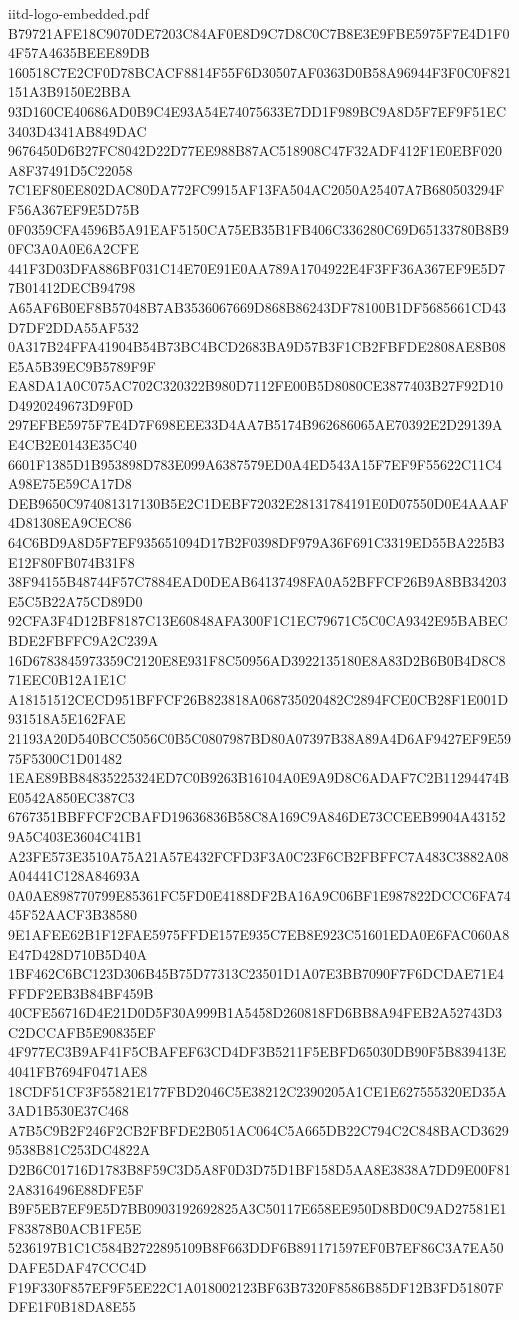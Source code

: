 \begin{filecontents*}[overwrite]{iitd-logo-embedded.pdf}
B79721AFE18C9070DE7203C84AF0E8D9C7D8C0C7B8E3E9FBE5975F7E4D1F04F57A4635BEEE89DB
160518C7E2CF0D78BCACF8814F55F6D30507AF0363D0B58A96944F3F0C0F821151A3B9150E2BBA
93D160CE40686AD0B9C4E93A54E74075633E7DD1F989BC9A8D5F7EF9F51EC3403D4341AB849DAC
9676450D6B27FC8042D22D77EE988B87AC518908C47F32ADF412F1E0EBF020A8F37491D5C22058
7C1EF80EE802DAC80DA772FC9915AF13FA504AC2050A25407A7B680503294FF56A367EF9E5D75B
0F0359CFA4596B5A91EAF5150CA75EB35B1FB406C336280C69D65133780B8B90FC3A0A0E6A2CFE
441F3D03DFA886BF031C14E70E91E0AA789A1704922E4F3FF36A367EF9E5D77B01412DECB94798
A65AF6B0EF8B57048B7AB3536067669D868B86243DF78100B1DF5685661CD43D7DF2DDA55AF532
0A317B24FFA41904B54B73BC4BCD2683BA9D57B3F1CB2FBFDE2808AE8B08E5A5B39EC9B5789F9F
EA8DA1A0C075AC702C320322B980D7112FE00B5D8080CE3877403B27F92D10D4920249673D9F0D
297EFBE5975F7E4D7F698EEE33D4AA7B5174B962686065AE70392E2D29139AE4CB2E0143E35C40
6601F1385D1B953898D783E099A6387579ED0A4ED543A15F7EF9F55622C11C4A98E75E59CA17D8
DEB9650C974081317130B5E2C1DEBF72032E28131784191E0D07550D0E4AAAF4D81308EA9CEC86
64C6BD9A8D5F7EF935651094D17B2F0398DF979A36F691C3319ED55BA225B3E12F80FB074B31F8
38F94155B48744F57C7884EAD0DEAB64137498FA0A52BFFCF26B9A8BB34203E5C5B22A75CD89D0
92CFA3F4D12BF8187C13E60848AFA300F1C1EC79671C5C0CA9342E95BABECBDE2FBFFC9A2C239A
16D6783845973359C2120E8E931F8C50956AD3922135180E8A83D2B6B0B4D8C871EEC0B12A1E1C
A18151512CECD951BFFCF26B823818A068735020482C2894FCE0CB28F1E001D931518A5E162FAE
21193A20D540BCC5056C0B5C0807987BD80A07397B38A89A4D6AF9427EF9E5975F5300C1D01482
1EAE89BB84835225324ED7C0B9263B16104A0E9A9D8C6ADAF7C2B11294474BE0542A850EC387C3
6767351BBFFCF2CBAFD19636836B58C8A169C9A846DE73CCEEB9904A431529A5C403E3604C41B1
A23FE573E3510A75A21A57E432FCFD3F3A0C23F6CB2FBFFC7A483C3882A08A04441C128A84693A
0A0AE898770799E85361FC5FD0E4188DF2BA16A9C06BF1E987822DCCC6FA7445F52AACF3B38580
9E1AFEE62B1F12FAE5975FFDE157E935C7EB8E923C51601EDA0E6FAC060A8E47D428D710B5D40A
1BF462C6BC123D306B45B75D77313C23501D1A07E3BB7090F7F6DCDAE71E4FFDF2EB3B84BF459B
40CFE56716D4E21D0D5F30A999B1A5458D260818FD6BB8A94FEB2A52743D3C2DCCAFB5E90835EF
4F977EC3B9AF41F5CBAFEF63CD4DF3B5211F5EBFD65030DB90F5B839413E4041FB7694F0471AE8
18CDF51CF3F55821E177FBD2046C5E38212C2390205A1CE1E627555320ED35A3AD1B530E37C468
A7B5C9B2F246F2CB2FBFDE2B051AC064C5A665DB22C794C2C848BACD36299538B81C253DC4822A
D2B6C01716D1783B8F59C3D5A8F0D3D75D1BF158D5AA8E3838A7DD9E00F812A8316496E88DFE5F
B9F5EB7EF9E5D7BB0903192692825A3C50117E658EE950D8BD0C9AD27581E1F83878B0ACB1FE5E
5236197B1C1C584B2722895109B8F663DDF6B891171597EF0B7EF86C3A7EA50DAFE5DAF47CCC4D
F19F330F857EF9F5EE22C1A018002123BF63B7320F8586B85DF12B3FD51807FDFE1F0B18DA8E55

\end{filecontents*}
